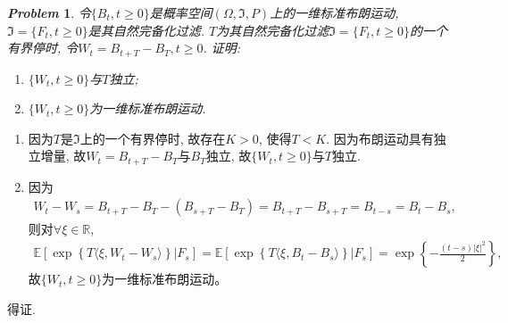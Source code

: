 \documentclass{article}
\makeatletter
\newtheorem{problem}{\itshape Problem}
\renewenvironment{proof}[1][\proofname]{\par
  \pushQED{\qed}%
  \normalfont \topsep6\p@\@plus6\p@\relax
  \trivlist
  \item[\hskip\labelsep
        \bfseries\itshape
    #1\@addpunct{.}]\ignorespaces
}{%
  \popQED\endtrivlist\@endpefalse
}
\newcommand{\E}[1]{\mathbb{E}\left[#1\right]}
\makeatother
\begin{document}
	\begin{problem}
		令$\{B_t,t\ge 0\}$是概率空间$(\Omega, \mathfrak{I}, P)$上的一维标准布朗运动, $\mathfrak{I} = \{F_t, t\ge 0\}$是其自然完备化过滤. $T$为其自然完备化过滤$\mathfrak{I} = \{F_t, t\ge 0\}$的一个有界停时, 令$W_t = B_{t+T} - B_{T}, t\ge 0$. 证明:
		\begin{enumerate}[label=(\arabic*)]
			\item $\{W_t,t\ge 0\}$与$T$独立;
			\item $\{W_t,t\ge 0\}$为一维标准布朗运动.
		\end{enumerate}
	\end{problem}

	\begin{proof}
  		\begin{enumerate}[label=(\arabic*)]
    		\item 因为$T$是$\mathfrak{I}$上的一个有界停时, 故存在$K>0$, 使得$T<K$. 因为布朗运动具有独立增量, 故$W_t = B_{t+T} - B_{T}$与$B_{T}$独立, 故$\{W_t,t\ge 0\}$与$T$独立.
    		\item 因为
    		\begin{eqnarray*}
      			W_t - W_s = B_{t+T} - B_{T} - \left(B_{s+T} - B_{T}\right) =  B_{t+T} - B_{s+T} = B_{t-s} = B_{t} - B_{s},
    		\end{eqnarray*}
    		则对$\forall \xi \in \mathbb{R}$, 
    		\begin{eqnarray*}
   				 \E{\left.\exp\left\{T\langle \xi, W_t-W_s \rangle\right\}\right|F_s} = \E{\left.\exp\left\{T\langle \xi, B_t-B_s \rangle\right\}\right|F_s} 
   				=  \exp\left\{-\frac{(t-s)\left|\xi\right|^2}{2}\right\},
    		\end{eqnarray*}
    		故$\{W_t,t\ge 0\}$为一维标准布朗运动。
  		\end{enumerate}
      得证.
	\end{proof}
\end{document}
